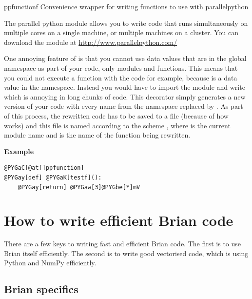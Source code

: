 \documentclass[letterpaper,10pt]{manual}
\begin{document}
\hypertarget{brian.ppfunction}{}\begin{funcdesc}{ppfunction}{f}
Convenience wrapper for writing functions to use with parallelpython

The parallel python module  allows you to write code that runs simultaneously
on multiple cores on a single machine, or multiple machines on a cluster. You can
download the module at \href{http://www.parallelpython.com/}{http://www.parallelpython.com/}

One annoying feature of  is that you cannot use data values that are in the
global namespace as part of your code, only modules and functions. This means that
you could not execute a function with the code  for example, because 
is a data value in the  namespace. Instead you would have to import
the  module and write  which is annoying in long chunks
of code. This decorator simply generates a new version of your code with every
name  from the  namespace replaced by . As part of this
process, the rewritten code has to be saved to a file (because of how  works)
and this file is named according to the scheme
, where  is the current
module name and  is the name of the function being rewritten.

\textbf{Example}

\begin{Verbatim}[commandchars=@\[\]]
@PYGaC[@at[]ppfunction]
@PYGay[def] @PYGaK[testf]():
    @PYGay[return] @PYGaw[3]@PYGbe[*]mV
\end{Verbatim}
\end{funcdesc}

\resetcurrentobjects
{}

\hypertarget{index-3}{}\section{How to write efficient Brian code}

There are a few keys to writing fast and efficient Brian code. The
first is to use Brian itself efficiently. The second is to write
good vectorised code, which is using Python and NumPy efficiently.


\subsection{Brian specifics}
\end{document}
